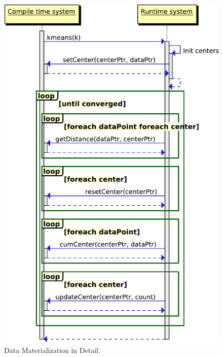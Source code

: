 \begin{figure}[htsb]
  \centering
  \includegraphics[scale=0.3]{figures/cpp_driven}
  \caption[Data Materialization in Detail]{Data Materialization in Detail.}
  \label{fig:cpp_driven}
\end{figure}

